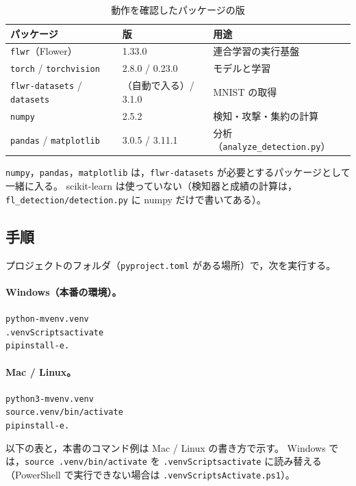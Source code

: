 \documentclass[a4j, dvipdfmx]{jsarticle}  %
\newenvironment{cmd}{\par\vspace{0.3em}\begin{alltt}\small}{\end{alltt}\vspace{0.3em}\par}
\begin{document}
\begin{table}[H]
\centering
\caption{動作を確認したパッケージの版}
\label{tab:versions}
\begin{tabular}{@{}lll@{}}
\toprule
パッケージ & 版 & 用途 \\
\midrule
\texttt{flwr}（Flower） & 1.33.0 & 連合学習の実行基盤 \\
\texttt{torch} / \texttt{torchvision} & 2.8.0 / 0.23.0 & モデルと学習 \\
\texttt{flwr-datasets} / \texttt{datasets} & （自動で入る）/ 3.1.0 & MNIST の取得 \\
\texttt{numpy} & 2.5.2 & 検知・攻撃・集約の計算 \\
\texttt{pandas} / \texttt{matplotlib} & 3.0.5 / 3.11.1 & 分析（\texttt{analyze\_detection.py}） \\
\bottomrule
\end{tabular}
\end{table}

\texttt{numpy}，\texttt{pandas}，\texttt{matplotlib} は，\texttt{flwr-datasets} が必要とするパッケージとして一緒に入る。
scikit-learn は使っていない（検知器と成績の計算は，\texttt{fl\_detection/detection.py} に numpy だけで書いてある）。

\subsection{手順}

プロジェクトのフォルダ（\texttt{pyproject.toml} がある場所）で，次を実行する。

\paragraph{Windows（本番の環境）。}
\begin{cmd}
python -m venv .venv
.venvScriptsactivate
pip install -e .
\end{cmd}

\paragraph{Mac / Linux。}
\begin{cmd}
python3 -m venv .venv
source .venv/bin/activate
pip install -e .
\end{cmd}

以下の表と，本書のコマンド例は Mac / Linux の書き方で示す。
Windows では，\texttt{source .venv/bin/activate} を \texttt{.venvScriptsactivate} に読み替える
（PowerShell で実行できない場合は \texttt{.venvScriptsActivate.ps1}）。
\end{document}

